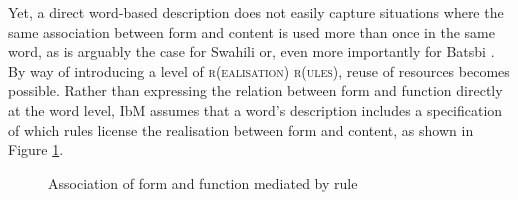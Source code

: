 \documentclass[output=paper]{langsci/langscibook}
\begin{document}
Yet, a direct word-based description does not easily capture situations
where the same association between form and content is used more
than once in the same word, as is arguably the case for Swahili
\citep{Stump93,Crysmann:Bonami:2016,Crysmann:Bonami:2017:HPSG} or,
even more importantly for Batsbi \citep{Harris09}. By way of
introducing a level of \textsc{r(ealisation) r(ules)}, reuse of
resources becomes possible. Rather than expressing the relation
between form and function directly at the word level, IbM assumes
that a word's description includes a specification of which rules
license the realisation between form and content, as shown in Figure
\ref{fig:WordRR}.


\begin{figure}
      \caption{Association of form and function mediated by rule\label{fig:WordRR}}
\end{figure}
\end{document}
